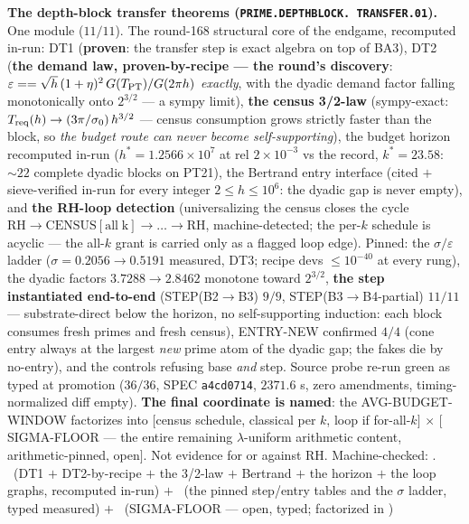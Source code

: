 \par\smallskip\noindent\textbf{The depth-block transfer theorems
(\texttt{PRIME.\allowbreak DEPTHBLOCK.\allowbreak
TRANSFER.01}).}
One module ($11/11$).  The round-168 structural core of the
endgame, recomputed in-run: DT1 (\textbf{proven}: the transfer
step is exact algebra on top of BA3), DT2 (\textbf{the demand
law, proven-by-recipe --- the round's discovery}:
$\varepsilon == \sqrt{h}\,(1 + \eta)^2\,G(T_{\rm PT})/G(2\pi h)$
\emph{exactly}, with the dyadic demand factor falling
monotonically onto $2^{3/2}$ --- a sympy limit), \textbf{the
census 3/2-law} (sympy-exact: $T_{\rm req}(h) \to
(3\pi/\sigma_0)\,h^{3/2}$ --- census consumption grows strictly
faster than the block, so \emph{the budget route can never
become self-supporting}), the budget horizon recomputed in-run
($h^* = 1.2566\times10^7$ at rel $2\times10^{-3}$ vs the record,
$k^* = 23.58$: ${\sim}22$ complete dyadic blocks on PT21), the
Bertrand entry interface (cited $+$ sieve-verified in-run for
every integer $2 \le h \le 10^6$: the dyadic gap is never
empty), and \textbf{the RH-loop detection} (universalizing the
census closes the cycle $\mathrm{RH} \to \mathrm{CENSUS[all\;k]}
\to \dots \to \mathrm{RH}$, machine-detected; the per-$k$
schedule is acyclic --- the all-$k$ grant is carried only as a
flagged loop edge).  Pinned: the $\sigma/\varepsilon$ ladder
($\sigma = 0.2056 \to 0.5191$ measured, DT3; recipe devs $\le
10^{-40}$ at every rung), the dyadic factors $3.7288 \to
2.8462$ monotone toward $2^{3/2}$, \textbf{the step instantiated
end-to-end} (STEP(B2$\to$B3) $9/9$, STEP(B3$\to$B4-partial)
$11/11$ --- substrate-direct below the horizon, no
self-supporting induction: each block consumes fresh primes and
fresh census), ENTRY-NEW confirmed $4/4$ (cone entry always at
the largest \emph{new} prime atom of the dyadic gap; the fakes
die by no-entry), and the controls refusing base \emph{and}
step.  Source probe re-run green as typed at promotion ($36/36$,
SPEC \texttt{a4cd0714}, $2371.6$ s, zero amendments,
timing-normalized diff empty).  \textbf{The final coordinate is
named}: the AVG-BUDGET-WINDOW factorizes into $[$census
schedule, classical per $k$, loop if for-all-$k]$ $\times$
$[$SIGMA-FLOOR --- the entire remaining $\lambda$-uniform
arithmetic content, arithmetic-pinned, open$]$.  Not evidence
for or against RH.
Machine-checked:
.
\mE\ (DT1 $+$ DT2-by-recipe $+$ the 3/2-law $+$ Bertrand $+$
the horizon $+$ the loop graphs, recomputed in-run) $+$ \mC\
(the pinned step/entry tables and the $\sigma$ ladder, typed
measured) $+$ \mO\ (SIGMA-FLOOR --- open, typed; factorized in
)
\par\smallskip



